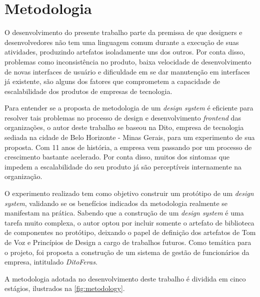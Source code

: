 
\chapter{Metodologia}
\label{chap:metodologia}

O desenvolvimento do presente trabalho parte da premissa de que designers e desenvolvedores não tem uma linguagem comum durante a execução de suas atividades, produzindo artefatos isoladamente uns dos outros. Por conta disso, problemas como inconsistência no produto, baixa velocidade de desenvolvimento de novas interfaces de usuário e dificuldade em se dar manutenção em interfaces já existente, são alguns dos fatores que comprometem a capacidade de escalabilidade dos produtos de empresas de tecnologia.

Para entender se a proposta de metodologia de um \textit{design system} é eficiente para resolver tais problemas no processo de design e desenvolvimento \textit{frontend} das organizações, o autor deste trabalho se baseou na Dito, empresa de tecnologia sediada na cidade de Belo Horizonte - Minas Gerais, para um experimento de sua proposta. Com 11 anos de história, a empresa vem passando por um processo de crescimento bastante acelerado. Por conta disso, muitos dos sintomas que impedem a escalabilidade do seu produto já são perceptíveis internamente na organização. 

O experimento realizado tem como objetivo construir um protótipo de um \textit{design system}, validando se os benefícios indicados da metodologia realmente se manifestam na prática. Sabendo que a construção de um \textit{design system} é uma tarefa muito complexa, o autor optou por incluir somente o artefato de biblioteca de componentes no protótipo, deixando o papel de definição dos artefatos de Tom de Voz e Princípios de Design a cargo de trabalhos futuros. Como temática para o projeto, foi proposta a construção de um sistema de gestão de funcionários da empresa, intitulado \textit{DitoFeras}.

A metodologia adotada no desenvolvimento deste trabalho é dividida em cinco estágios, ilustrados na \autoref{fig:metodology}.


